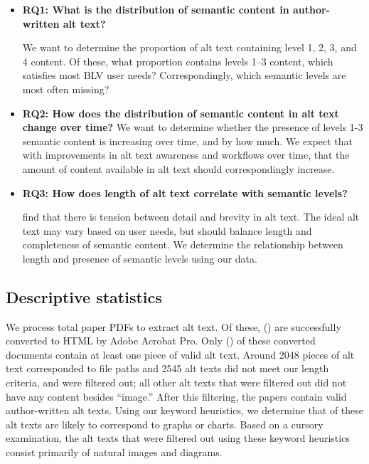 \documentclass[sigconf]{acmart}
\begin{document}
\begin{itemize}
    \item \textbf{RQ1: What is the distribution of semantic content in author-written alt text?}

    We want to determine the proportion of alt text containing level 1, 2, 3, and 4 content. Of these, what proportion contains levels 1--3 content, which satisfies most BLV user needs? Correspondingly, which semantic levels are most often missing?
 
    \item \textbf{RQ2: How does the distribution of semantic content in alt text change over time?} We want to determine whether the presence of levels 1-3 semantic content is increasing over time, and by how much. We expect that with improvements in alt text awareness and workflows over time, that the amount of content available in alt text should correspondingly increase.
    \item \textbf{RQ3: How does length of alt text correlate with semantic levels?} 
 
    \citet{Mack2021DesigningTF} find that there is tension between detail and brevity in alt text. The ideal alt text may vary based on user needs, but should balance length and completeness of semantic content. We determine the relationship between length and presence of semantic levels using our data.

\end{itemize}

\subsection{Descriptive statistics}

We process \numtotalpdfs total paper PDFs to extract alt text. Of these, \numconvertedpdfs (\percconvertedpdfs) are successfully converted to HTML by Adobe Acrobat Pro. Only \numpaperswithvalidalttext (\percpaperswithvalid) of these converted documents contain at least one piece of valid alt text. Around 2048 pieces of alt text corresponded to file paths and 2545 alt texts did not meet our length criteria, and were filtered out; all other alt texts that were filtered out did not have any content besides ``image.'' After this filtering, the \numpaperswithvalidalttext papers contain \numvalidalttext valid author-written alt texts. Using our keyword heuristics, we determine that \numannotated of these alt texts are likely to correspond to graphs or charts. Based on a cursory examination, the alt texts that were filtered out using these keyword heuristics consist primarily of natural images and diagrams. 
\end{document}
